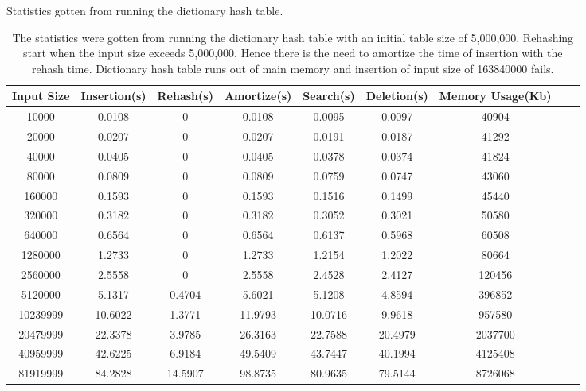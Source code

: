 \documentclass[a4paper,12pt, openany]{book}
\begin{document}
\begin{table}[H]
	\small\addtolength{\tabcolsep}{-5pt}
	
	\begin{center}
		\caption{Statistics gotten from running the dictionary hash table. }
		\label{tab:conpactchaining}
		\begin{tabular}{|c|c|c|c|c|c|c|c|c|} %
			\hline
			\textbf{Input Size}  & \textbf{Insertion(s)} & \textbf{Rehash(s)} & \textbf{Amortize(s)} & \textbf{Search(s)} & \textbf{Deletion(s)} & \textbf{Memory Usage(Kb)}\\
			\hline
			
			10000&	0.0108&	0&	0.0108&	0.0095&	0.0097&	40904\\
			20000&	0.0207&	0&	0.0207&	0.0191&	0.0187&	41292\\
			40000&	0.0405&	0&	0.0405&	0.0378&	0.0374&	41824\\
			80000&	0.0809&	0&	0.0809&	0.0759&	0.0747&	43060\\
			160000&	0.1593&	0&	0.1593&	0.1516&	0.1499&	45440\\
			320000&	0.3182&	0&	0.3182&	0.3052&	0.3021&	50580\\
			640000&	0.6564&	0&	0.6564&	0.6137&	0.5968&	60508\\
			1280000&	1.2733&	0&	1.2733&	1.2154&	1.2022&	80664\\
			2560000&	2.5558&	0&	2.5558&	2.4528&	2.4127&	120456\\
			5120000&	5.1317&	0.4704&	5.6021&	5.1208&	4.8594&	396852\\
			10239999&	10.6022&	1.3771&	11.9793&	10.0716&	9.9618&	957580\\
			20479999&	22.3378	&3.9785&	26.3163&	22.7588&	20.4979&	2037700\\
			40959999&	42.6225	&6.9184&	49.5409&	43.7447&	40.1994&	4125408\\
			81919999&	84.2828	&14.5907&	98.8735&	80.9635&	79.5144&	8726068\\
			
			\hline
			
			
			
			
		\end{tabular}\bigbreak
		\caption*{The statistics were gotten from running the dictionary hash table with an initial table size of 5,000,000. Rehashing start when the input size exceeds 5,000,000. Hence there is the need to amortize the time of insertion with the rehash time. Dictionary hash table runs out of main memory and insertion of input size of 163840000 fails.}
	\end{center}
\end{table}
\end{document}
